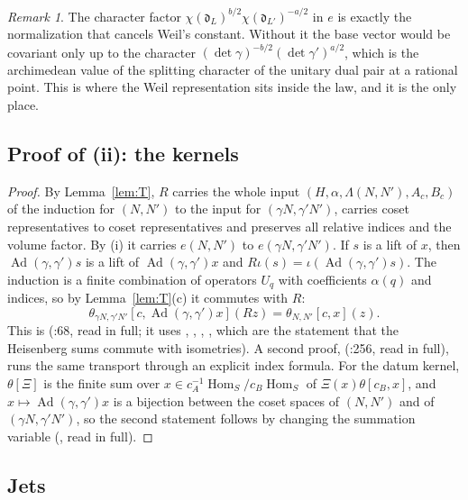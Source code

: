 \documentclass[11pt]{article}
\newcommand{\Ad}{\operatorname{Ad}}
\newcommand{\Hom}{\operatorname{Hom}}
\theoremstyle{definition}
\theoremstyle{remark}
\newtheorem{remark}[theorem]{Remark}
\begin{document}
\begin{remark}
The character factor $\chi(\mathfrak d_L)^{b/2}\chi(\mathfrak d_{L'})^{-a/2}$ in $e$ is exactly the normalization that cancels Weil's constant. Without it the base vector would be covariant only up to the character $(\det\gamma)^{-b/2}(\det\gamma')^{a/2}$, which is the archimedean value of the splitting character of the unitary dual pair at a rational point. This is where the Weil representation sits inside the law, and it is the only place.
\end{remark}

\subsection{Proof of (ii): the kernels}

\begin{proof}
By Lemma~\ref{lem:T}, $R$ carries the whole input $(H,\alpha,\Lambda(N,N'),A_c,B_c)$ of the induction for $(N,N')$ to the input for $(\gamma N,\gamma'N')$, carries coset representatives to coset representatives and preserves all relative indices and the volume factor. By (i) it carries $e(N,N')$ to $e(\gamma N,\gamma'N')$. If $s$ is a lift of $x$, then $\Ad(\gamma,\gamma')s$ is a lift of $\Ad(\gamma,\gamma')x$ and $R\iota(s)=\iota(\Ad(\gamma,\gamma')s)$. The induction is a finite combination of operators $U_q$ with coefficients $\alpha(q)$ and indices, so by Lemma~\ref{lem:T}(c) it commutes with $R$:
\[
\theta_{\gamma N,\gamma'N'}[c,\Ad(\gamma,\gamma')x](Rz)=\theta_{N,N'}[c,x](z).
\]
This is  (:68, read in full; it uses , , , , which are the statement that the Heisenberg sums commute with isometries). A second proof,  (:256, read in full), runs the same transport through an explicit index formula. For the datum kernel, $\theta[\Xi]$ is the finite sum over $x\in c_A^{-1}\Hom_S/c_B\Hom_S$ of $\Xi(x)\theta[c_B,x]$, and $x\mapsto\Ad(\gamma,\gamma')x$ is a bijection between the coset spaces of $(N,N')$ and of $(\gamma N,\gamma'N')$, so the second statement follows by changing the summation variable (, read in full).
\end{proof}

\subsection{Jets}
\end{document}
